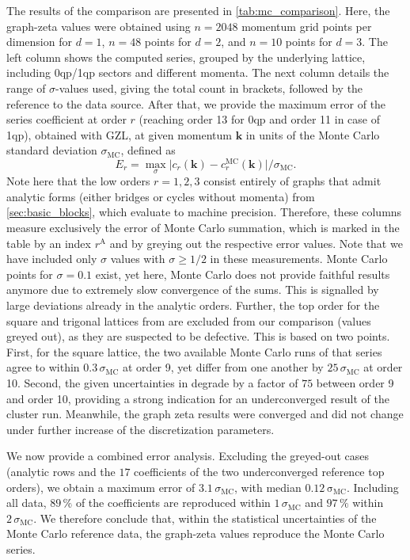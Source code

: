 \documentclass[]{amsart}
\numberwithin{mythm}{section}
\begin{document}
The results of the comparison are presented in \cref{tab:mc_comparison}. Here, the graph-zeta values were obtained using $n=2048$ momentum grid points per dimension for $d=1$, $n=48$ points for $d=2$, and $n=10$ points for $d=3$. The left column shows the computed series, grouped by the underlying lattice, including 0qp/1qp sectors and different momenta. The next column details the range of $\sigma$-values used, giving the total count in brackets, followed by the reference to the data source. After that, we provide the maximum error of the series coefficient at order $r$ (reaching order 13 for 0qp and order 11 in case of 1qp), obtained with GZL, at given momentum $\bm k$ in units of the Monte Carlo standard deviation $\sigma_{\mathrm{MC}}$, defined as
\[
E_r=\max_{\sigma}\Big\vert c_r(\bm k)-c_r^{\mathrm{MC}}(\bm k)\Big \vert/\sigma_{\mathrm{MC}}.
\]
Note here that the low orders $r=1,2,3$ consist entirely of graphs that admit analytic forms (either bridges or cycles without momenta) from \cref{sec:basic_blocks}, which evaluate to machine precision. Therefore, these columns measure exclusively the error of Monte Carlo summation, which is marked in the table by an index $r^
\mathrm{A}$ and by greying out the respective error values. Note that we have included only $\sigma$ values with $\sigma\ge 1/2$ in these measurements. Monte Carlo points for $\sigma = 0.1$ exist, yet here, Monte Carlo does not provide faithful results anymore due to extremely slow convergence of the sums. This is signalled by large deviations already in the analytic orders. Further, the top order for the square and trigonal lattices from \cite{Fey2020Diss} are excluded from our comparison (values greyed out), as they are suspected to be defective. This is based on two points. First, for the square lattice, the two available Monte Carlo runs of that series agree
to within $0.3\,\sigma_{\mathrm{MC}}$ at order 9, yet differ from one another by $25\,\sigma_{\mathrm{MC}}$ at order 10. Second, the given uncertainties in \cite{Fey2020Diss} degrade by a factor of $75$ between order 9 and order 10, providing a strong indication for an underconverged result of the cluster run. Meanwhile, the graph zeta results were converged and did not change under further increase of the discretization parameters.

We now provide a combined error analysis. Excluding the greyed-out cases (analytic rows and the $17$ coefficients of the two underconverged reference top orders), we obtain a maximum error of $3.1\,\sigma_\mathrm{MC}$, with median $0.12\,\mathrm{\sigma_\mathrm{MC}}$. Including all data, $89\,\%$ of the coefficients are reproduced within $1\,\sigma_{\mathrm{MC}}$ and $97\,\%$ within $2\,\sigma_{\mathrm{MC}}$. We therefore conclude that, within the statistical uncertainties of the Monte Carlo reference data, the
graph-zeta values reproduce the Monte Carlo series.
\end{document}
